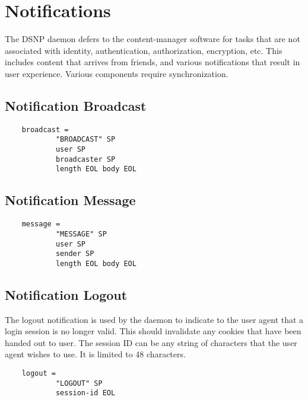 \documentclass[letterpaper,11pt,oneside]{article}
\begin{document}
\section{Notifications}

The DSNP daemon defers to the content-manager software for tasks that are not
associated with identity, authentication, authorization, encryption, etc. This
includes content that arrives from friends, and various notifications that
result in user experience. Various components require synchronization.

\subsection{Notification Broadcast}

\vspace{10pt}
\begin{verbatim}
    broadcast =
            "BROADCAST" SP
            user SP 
            broadcaster SP 
            length EOL body EOL
\end{verbatim}
\vspace{10pt}

\subsection{Notification Message}

\vspace{10pt}
\begin{verbatim}
    message = 
            "MESSAGE" SP
            user SP 
            sender SP 
            length EOL body EOL
\end{verbatim}
\vspace{10pt}

\subsection{Notification Logout}

The logout notification is used by the daemon to indicate to the user agent
that a login session is no longer valid. This should invalidate any cookies
that have been handed out to user. The session ID can be any string of
characters that the user agent wishes to use. It is limited to 48 characters.

\vspace{10pt}
\begin{verbatim}
    logout = 
            "LOGOUT" SP
            session-id EOL
\end{verbatim}
\vspace{10pt}
\end{document}
